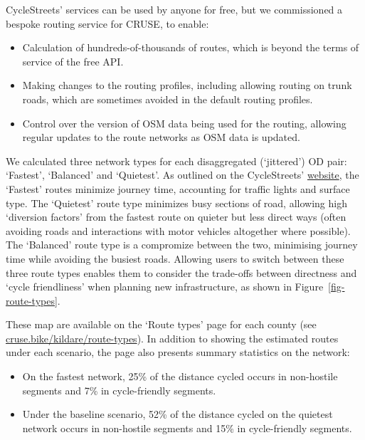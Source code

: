 \documentclass[
  super,
  preprint,
  3p]{elsarticle}
\providecommand{\tightlist}{%
  \setlength{\itemsep}{0pt}\setlength{\parskip}{0pt}}\usepackage{longtable,booktabs,array}
\begin{document}
CycleStreets' services can be used by anyone for free, but we
commissioned a bespoke routing service for CRUSE, to enable:

\begin{itemize}
\tightlist
\item
  Calculation of hundreds-of-thousands of routes, which is beyond the
  terms of service of the free API.
\item
  Making changes to the routing profiles, including allowing routing on
  trunk roads, which are sometimes avoided in the default routing
  profiles.
\item
  Control over the version of OSM data being used for the routing,
  allowing regular updates to the route networks as OSM data is updated.
\end{itemize}

We calculated three network types for each disaggregated (`jittered') OD
pair: `Fastest', `Balanced' and `Quietest'. As outlined on the
CycleStreets'
\href{https://www.cyclestreets.net/help/journey/howitworks/}{website},
the `Fastest' routes minimize journey time, accounting for traffic
lights and surface type. The `Quietest' route type minimizes busy
sections of road, allowing high `diversion factors' from the fastest
route on quieter but less direct ways (often avoiding roads and
interactions with motor vehicles altogether where possible). The
`Balanced' route type is a compromize between the two, minimising
journey time while avoiding the busiest roads. Allowing users to switch
between these three route types enables them to consider the trade-offs
between directness and `cycle friendliness' when planning new
infrastructure, as shown in Figure~\ref{fig-route-types}.

These map are available on the `Route types' page for each county (see
\href{https://cruse.bike/kildare/route-types}{cruse.bike/kildare/route-types}).
In addition to showing the estimated routes under each scenario, the
page also presents summary statistics on the network:

\begin{itemize}
\item
  On the fastest network, 25\% of the distance cycled occurs in
  non-hostile segments and 7\% in cycle-friendly segments.
\item
  Under the baseline scenario, 52\% of the distance cycled on the
  quietest network occurs in non-hostile segments and 15\% in
  cycle-friendly segments.
\end{itemize}
\end{document}
